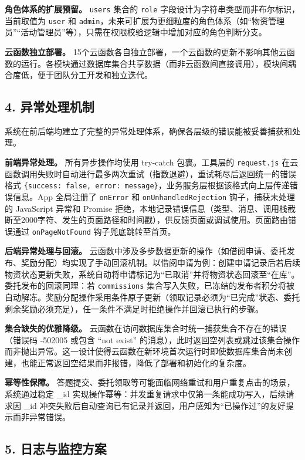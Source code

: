 \documentclass[a4paper,12pt]{article}
\begin{document}
\textbf{角色体系的扩展预留。} \texttt{users} 集合的 \texttt{role} 字段设计为字符串类型而非布尔标识，当前取值为 \texttt{user} 和 \texttt{admin}，未来可扩展为更细粒度的角色体系（如“物资管理员”“活动管理员”等），只需在权限校验逻辑中增加对应的角色判断分支。

\textbf{云函数独立部署。} 15个云函数各自独立部署，一个云函数的更新不影响其他云函数的运行。各模块通过数据库集合共享数据（而非云函数间直接调用），模块间耦合度低，便于团队分工开发和独立迭代。

\subsection{4. 异常处理机制}

系统在前后端均建立了完整的异常处理体系，确保各层级的错误能被妥善捕获和处理。

\textbf{前端异常处理。} 所有异步操作均使用 try-catch 包裹。工具层的 \texttt{request.js} 在云函数调用失败时自动进行最多两次重试（指数退避），重试耗尽后返回统一的错误格式 \texttt{\{success:\allowbreak\ false,\allowbreak\ error:\allowbreak\ message\}}，业务服务层根据该格式向上层传递错误信息。App 全局注册了 \texttt{onError} 和 \texttt{onUnhandledRejection} 钩子，捕获未处理的 JavaScript 异常和 Promise 拒绝，本地记录错误信息（类型、消息、调用栈截断至2000字符、发生的页面路径和时间戳），供反馈页面或调试使用。页面路由错误通过 \texttt{onPageNotFound} 钩子兜底跳转至首页。

\textbf{后端异常处理与回滚。} 云函数中涉及多步数据更新的操作（如借阅申请、委托发布、奖励分配）均实现了手动回滚机制。以借阅申请为例：创建申请记录后若后续物资状态更新失败，系统自动将申请标记为“已取消”并将物资状态回滚至“在库”。委托发布的回滚同理：若 \texttt{commissions} 集合写入失败，已冻结的发布者积分将被自动解冻。奖励分配操作采用条件原子更新（领取记录必须为“已完成”状态、委托剩余奖励必须充足），任一条件不满足时拒绝操作并回滚已执行的步骤。

\textbf{集合缺失的优雅降级。} 云函数在访问数据库集合时统一捕获集合不存在的错误（错误码 -502005 或包含 “not exist” 的消息），此时返回空列表或跳过该集合操作而非抛出异常。这一设计使得云函数在新环境首次运行时即使数据库集合尚未创建，也能正常返回空结果而非报错，降低了部署和初始化的复杂度。

\textbf{幂等性保障。} 答题提交、委托领取等可能面临网络重试和用户重复点击的场景，系统通过稳定 \_id 实现操作幂等：并发重复请求中仅第一条能成功写入，后续请求因 \_id 冲突失败后自动查询已有记录并返回，用户感知为“已操作过”的友好提示而非异常错误。

\subsection{5. 日志与监控方案}
\end{document}
